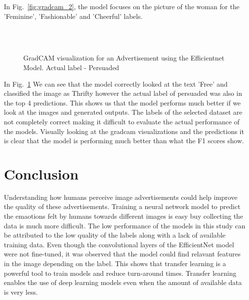 \documentclass[conference]{IEEEtran}
\begin{document}
In Fig.~\ref{fig:gradcam_2}, the model focuses on the picture of the woman for the 'Feminine', 'Fashionable' and 'Cheerful' labels.

\begin{figure}
    
    \\
    \\
    \caption{GradCAM visualization for an Advertisement using the Efficientnet Model. Actual label - Persuaded}
    \label{fig:gradcam_9}
  \end{figure}

In Fig.~\ref{fig:gradcam_9} We can see that the model correctly looked at the text 'Free' and classified the image as Thrifty however the actual label of persuaded was also in the top 4 predictions. This shows us that the model performs much better if we look at the images and generated outputs. The labels of the selected dataset are not completely correct making it difficult to evaluate the actual performance of the models. Visually looking at the gradcam visualizations and the predictions it is clear that the model is performing much better than what the F1 scores show.




\section{Conclusion}

Understanding how humans perceive image advertisements could help improve the quality of 
these advertisements. Training a neural network model to predict the emaotions 
felt by humans towards different images is easy buy collecting the data is much 
more difficult. The low performance of the models in this study can be attributed 
to the low quality of the labels along with a lack of available training data. 
Even though the convolutional layers of the EfficientNet model were not fine-tuned, 
it was observed that the model could find relavant features in the image depending on 
the label. This shows that transfer learning is a powerful tool to train models and reduce 
turn-around times. Transfer learning enables the use of deep learning models even when the 
amount of available data is very less. 
\end{document}
